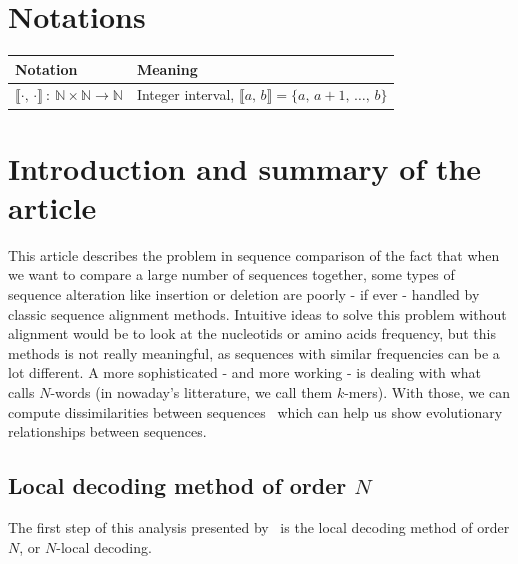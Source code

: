 \documentclass[english,13pt,a4paper]{article}
\theoremstyle{definition}
\theoremstyle{remark}
\theoremstyle{defstyle}
\newcommand{\I}[1]{\mathbb{#1}}
\begin{document}



\normalsize
\tableofcontents

\newpage

\section*{Notations}\label{sec:notation}

\begin{table}[h!]
    \centering
    \begin{tabular}{p{5cm} p{13cm}}
        \hline
        Notation & Meaning\\
        \hline
        $\llbracket \cdot, \, \cdot \rrbracket \: : \: \I N \times \I N \to \I N$ & Integer interval, $\llbracket a, \, b \rrbracket = \{a, \, a+1, \, \ldots, \, b\}$
    \end{tabular}
\end{table}

\section{Introduction and summary of the article}\label{seq:summary}

This article describes the problem in sequence comparison of the fact that when we want to compare a large number of sequences together, some types of sequence alteration like insertion or deletion are poorly - if ever - handled by classic sequence alignment methods. Intuitive ideas to solve this problem without alignment would be to look at the nucleotids or amino acids frequency, but this methods is not really meaningful, as sequences with similar frequencies can be a lot different. A more sophisticated - and more working - is dealing with what~\cite{didier_comparing_2007} calls $N$-words (in nowaday's litterature, we call them $k$-mers). With those, we can compute dissimilarities between sequences~\cite{karlin1994comparisons} which can help us show evolutionary relationships between sequences.\\

\subsection{Local decoding method of order $N$}

The first step of this analysis presented by~\cite{didier_comparing_2007} is the local decoding method of order $N$, or $N$-local decoding. \\
\end{document}

